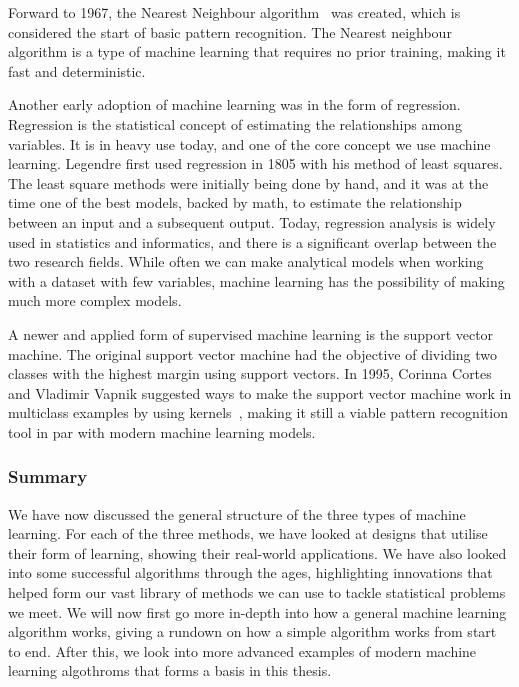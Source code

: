 \vspace{5px}

Forward to 1967, the Nearest Neighbour algorithm~\cite{Cover:2006:NNP:2263261.2267456} was created, which is considered the start of basic pattern recognition. The Nearest neighbour algorithm is a type of machine learning that requires no prior training, making it fast and deterministic.

\vspace{5px}

Another early adoption of machine learning was in the form of regression. Regression is the statistical concept of estimating the relationships among variables. It is in heavy use today, and one of the core concept we use machine learning.
Legendre first used regression in 1805 with his method of least squares. The least square methods were initially being done by hand, and it was at the time one of the best models, backed by math, to estimate the relationship between an input and a subsequent output. 
Today, regression analysis is widely used in statistics and informatics, and there is a significant overlap between the two research fields. While often we can make analytical models when working with a dataset with few variables, machine learning has the possibility of making much more complex models.

\vspace{5px}

A newer and applied form of supervised machine learning is the support vector machine. The original support vector machine had the objective of dividing two classes with the highest margin using support vectors.
In 1995, Corinna Cortes and Vladimir Vapnik suggested ways to make the support vector machine work in multiclass examples by using kernels~\cite{cortes1995support}, making it still a viable pattern recognition tool in par with modern machine learning models.



\subsubsection{Summary} 

We have now discussed the general structure of the three types of machine learning. For each of the three methods, we have looked at designs that utilise their form of learning, showing their real-world applications.
We have also looked into some successful algorithms through the ages, highlighting innovations that helped form our vast library of methods we can use to tackle statistical problems we meet.
We will now first go more in-depth into how a general machine learning algorithm works, giving a rundown on how a simple algorithm works from start to end.
After this, we look into more advanced examples of modern machine learning algothroms that forms a basis in this thesis.


